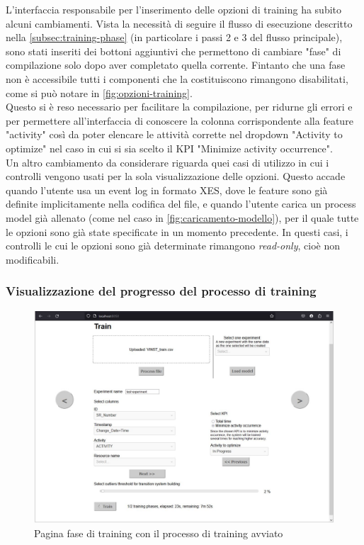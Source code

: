 L'interfaccia responsabile per l'inserimento delle opzioni di training ha subito alcuni cambiamenti. Vista la necessità di seguire il flusso di esecuzione descritto nella \autoref{subsec:training-phase} (in particolare i passi 2 e 3 del flusso principale), sono stati inseriti dei bottoni aggiuntivi che permettono di cambiare "fase" di compilazione solo dopo aver completato quella corrente.
Fintanto che una fase non è accessibile tutti i componenti che la costituiscono rimangono disabilitati, come si può notare in \autoref{fig:opzioni-training}.\\
Questo si è reso necessario per facilitare la compilazione, per ridurne gli errori e per permettere all'interfaccia di conoscere la colonna corrispondente alla feature "activity" così da poter elencare le attività corrette nel \gls{dropdown} "Activity to optimize" nel caso in cui si sia scelto il KPI "Minimize activity occurrence".
\\
Un altro cambiamento da considerare riguarda quei casi di utilizzo in cui i controlli vengono usati per la sola visualizzazione delle opzioni.
Questo accade quando l'utente usa un event log in formato XES, dove le feature sono già definite implicitamente nella codifica del file, e quando l'utente carica un process model già allenato (come nel caso in \autoref{fig:caricamento-modello}), per il quale tutte le opzioni sono già state specificate in un momento precedente. In questi casi, i controlli le cui le opzioni sono già determinate rimangono \textit{read-only}, cioè non modificabili. 


\subsubsection{Visualizzazione del progresso del processo di training}
\label{subsubsec:progress-train}

\begin{figure}[H] 
    \centering 
    \includegraphics[width=0.7\columnwidth]{immagini/pag-train-started-training.jpg} 
    \caption{Pagina fase di training con il processo di training avviato}
    \label{fig:progresso-train}
\end{figure}

